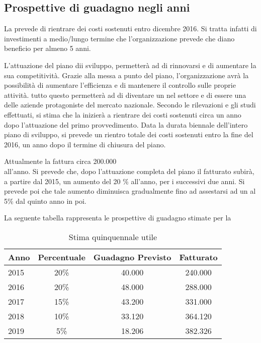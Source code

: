 \subsection{ Prospettive di guadagno negli anni}
La \customer prevede di rientrare dei costi sostenuti entro dicembre 2016. Si tratta infatti di investimenti a medio/lungo termine che l'organizzazione prevede che diano beneficio per almeno 5 anni.

L'attuazione del piano dii sviluppo, permetterà ad  \customer di rinnovarsi e di aumentare la sua competitività. Grazie alla messa a punto del piano, l'organizzazione avrà la possibilità di aumentare l'efficienza e di mantenere il controllo sulle proprie attività. tutto questo permetterà ad \customer di diventare un  nel settore e di essere una delle aziende protagoniste del mercato nazionale. 
Secondo le rilevazioni e gli studi effettuati, si stima che la \customer inizierà a rientrare dei costi sostenuti circa un anno dopo l'attuazione del primo provvedimento. Data la durata biennale dell'intero piano di sviluppo, si prevede un rientro totale dei costi sostenuti entro la fine del 2016, un anno dopo il termine di chiusura del piano.

Attualmente la \customer fattura circa 200.000 \text{\euro} \\ all'anno. Si prevede che, dopo l'attuazione completa del piano il fatturato subirà, a partire dal 2015, un aumento del 20 \% all'anno, per i successivi due anni. Si prevede poi che tale aumento diminuisca gradualmente fino ad assestarsi ad un al 5\% dal quinto anno in poi.
 
La seguente tabella rappresenta le prospettive di guadagno stimate per la \customer

\begin{table}[H]
\centering
\begin{tabular}{|p{}|c|c|c|}
\hline 

\textbf{ Anno} &  \textbf{Percentuale} &\textbf{Guadagno Previsto}& \textbf{Fatturato}\\
\hline
 2015 & 20\% & \text{\euro} 40.000 &\text{\euro} 240.000 \\
 2016 & 20\% & \text{\euro} 48.000 & \text{\euro} 288.000 \\
 2017 & 15\% & \text{\euro} 43.200 & \text{\euro} 331.000\\
 2018 & 10\% & \text{\euro} 33.120 & \text{\euro} 364.120\\
 2019 & 5\% & \text{\euro} 18.206 &  \text{\euro} 382.326\\
\hline

\end{tabular}
\caption{Stima quinquennale utile }\label{tab:utile}
\end{table}


